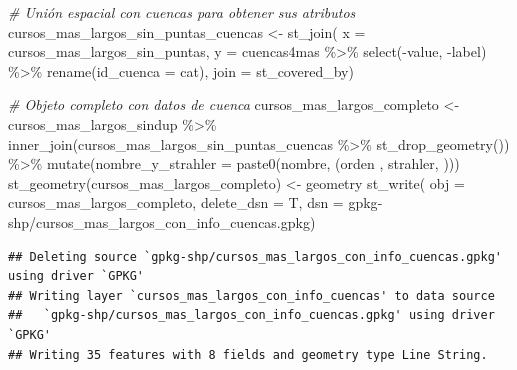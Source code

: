 \documentclass[spanish]{article}
\newenvironment{Shaded}{\begin{snugshade}}{\end{snugshade}}
\newcommand{\AttributeTok}[1]{\textcolor[rgb]{0.77,0.63,0.00}{#1}}
\newcommand{\CommentTok}[1]{\textcolor[rgb]{0.56,0.35,0.01}{\textit{#1}}}
\newcommand{\FunctionTok}[1]{\textcolor[rgb]{0.00,0.00,0.00}{#1}}
\newcommand{\NormalTok}[1]{#1}
\newcommand{\OtherTok}[1]{\textcolor[rgb]{0.56,0.35,0.01}{#1}}
\newcommand{\SpecialCharTok}[1]{\textcolor[rgb]{0.00,0.00,0.00}{#1}}
\newcommand{\StringTok}[1]{\textcolor[rgb]{0.31,0.60,0.02}{#1}}
\begin{document}
\begin{Shaded}
\begin{Highlighting}[]
\CommentTok{\# Unión espacial con cuencas para obtener sus atributos}
\NormalTok{cursos\_mas\_largos\_sin\_puntas\_cuencas }\OtherTok{\textless{}{-}} \FunctionTok{st\_join}\NormalTok{(}
  \AttributeTok{x =}\NormalTok{ cursos\_mas\_largos\_sin\_puntas,}
  \AttributeTok{y =}\NormalTok{ cuencas4mas }\SpecialCharTok{\%\textgreater{}\%} \FunctionTok{select}\NormalTok{(}\SpecialCharTok{{-}}\NormalTok{value, }\SpecialCharTok{{-}}\NormalTok{label) }\SpecialCharTok{\%\textgreater{}\%} \FunctionTok{rename}\NormalTok{(}\AttributeTok{id\_cuenca =}\NormalTok{ cat),}
  \AttributeTok{join =}\NormalTok{ st\_covered\_by)}

\CommentTok{\# Objeto completo con datos de cuenca}
\NormalTok{cursos\_mas\_largos\_completo }\OtherTok{\textless{}{-}}\NormalTok{ cursos\_mas\_largos\_sindup }\SpecialCharTok{\%\textgreater{}\%}
  \FunctionTok{inner\_join}\NormalTok{(cursos\_mas\_largos\_sin\_puntas\_cuencas }\SpecialCharTok{\%\textgreater{}\%} \FunctionTok{st\_drop\_geometry}\NormalTok{()) }\SpecialCharTok{\%\textgreater{}\%} 
  \FunctionTok{mutate}\NormalTok{(}\StringTok{\textasciigrave{}}\AttributeTok{nombre\_y\_strahler}\StringTok{\textasciigrave{}} \OtherTok{=} \FunctionTok{paste0}\NormalTok{(nombre, }\StringTok{\textquotesingle{} (orden \textquotesingle{}}\NormalTok{, strahler, }\StringTok{\textquotesingle{})\textquotesingle{}}\NormalTok{))}
\FunctionTok{st\_geometry}\NormalTok{(cursos\_mas\_largos\_completo) }\OtherTok{\textless{}{-}} \StringTok{\textquotesingle{}geometry\textquotesingle{}}
\FunctionTok{st\_write}\NormalTok{(}
  \AttributeTok{obj =}\NormalTok{ cursos\_mas\_largos\_completo, }\AttributeTok{delete\_dsn =}\NormalTok{ T,}
  \AttributeTok{dsn =} \StringTok{\textquotesingle{}gpkg{-}shp/cursos\_mas\_largos\_con\_info\_cuencas.gpkg\textquotesingle{}}\NormalTok{)}
\end{Highlighting}
\end{Shaded}

\begin{verbatim}
## Deleting source `gpkg-shp/cursos_mas_largos_con_info_cuencas.gpkg' using driver `GPKG'
## Writing layer `cursos_mas_largos_con_info_cuencas' to data source 
##   `gpkg-shp/cursos_mas_largos_con_info_cuencas.gpkg' using driver `GPKG'
## Writing 35 features with 8 fields and geometry type Line String.
\end{verbatim}
\end{document}
